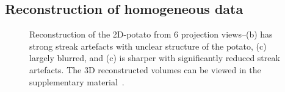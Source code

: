 \documentclass[journal]{IEEEtran}
\begin{document}


\subsection{Reconstruction of homogeneous data}
\label{Sec:potato}
\begin{figure}[!h]
\centering
{}
\caption{Reconstruction of the 2D-potato from 6 projection views--(b) has strong streak artefacts with unclear structure of the potato, (c) largely blurred, and (c) is sharper with significantly reduced streak artefacts. The 3D reconstructed volumes can be viewed in the supplementary material~\cite{supp_paper}.}
\label{fig:potato_3D_results_A}
\end{figure}
\end{document}
